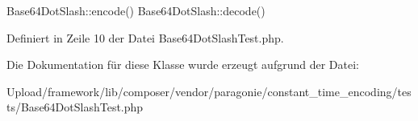 Base64\+Dot\+Slash\+::encode()  Base64\+Dot\+Slash\+::decode() 

Definiert in Zeile 10 der Datei Base64\+Dot\+Slash\+Test.\+php.



Die Dokumentation für diese Klasse wurde erzeugt aufgrund der Datei\+:\begin{DoxyCompactItemize}
\item 
Upload/framework/lib/composer/vendor/paragonie/constant\+\_\+time\+\_\+encoding/tests/Base64\+Dot\+Slash\+Test.\+php\end{DoxyCompactItemize}
